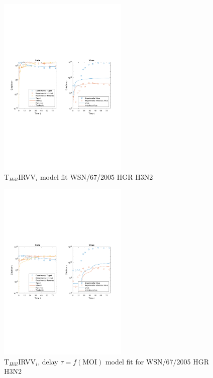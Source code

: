 \newpage

\begin{figure}[H]
\begin{center}
\includegraphics[width=0.55\textwidth, trim={1cm 9.8cm 1cm 9.5cm}, clip]{D_chapters/6_appendix/4_ValidationH3N2/InfectionDepletionModelTHillIRVViMOI0.002log.pdf}
\caption[T$_{Hill}$IRVV$_i$ model fit for WSN/67/2005 HGR H3N2]%
{T$_{Hill}$IRVV$_i$ model fit WSN/67/2005 HGR H3N2}
\label{figure:THillIRVViValidationH3N2}
\end{center}
\end{figure}

\begin{figure}[H]
\begin{center}
\includegraphics[width=0.55\textwidth, trim={1cm 9.8cm 1cm 9.5cm}, clip]{D_chapters/6_appendix/4_ValidationH3N2/InfectionDepletionModelTHillIRVViDelayMOI0.002log.pdf}
\caption[T$_{Hill}$IRVV$_i$, delay $\tau = f(\text{MOI})$ model fit for WSN/67/2005 HGR H3N2]%
{T$_{Hill}$IRVV$_i$, delay $\tau = f(\text{MOI})$ model fit for WSN/67/2005 HGR H3N2}
\label{figure:THillIRVViDelayValidationH3N2}
\end{center}
\end{figure}

